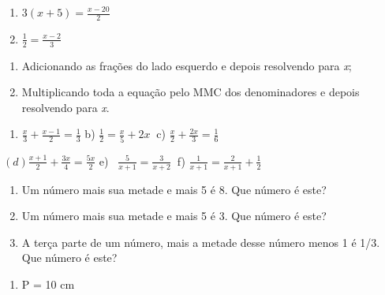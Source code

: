 \begin{exercicios}
\begin{enumerate}
	\item  \( 3 \left( x+5 \right) =\frac{x-20}{2} \)

	\item  \( \frac{1}{2}=\frac{x-2}{3} \)
\end{enumerate}


\begin{enumerate}
	\item Adicionando as frações do lado esquerdo e depois resolvendo para \textit{x};

	\item Multiplicando toda a equação pelo MMC dos denominadores e depois resolvendo para \textit{x}.
\end{enumerate}


\begin{enumerate}
	\item  \( \frac{x}{3}+\frac{x-1}{2}=\frac{1}{3} \) { b)  \( \frac{1}{2}=\frac{x}{5}+2x~  \) c)  \( \frac{x}{2}+\frac{2x}{3}=\frac{1}{6} \) }
\end{enumerate}

 \((d)  \frac{x+1}{2}+\frac{3x}{4}=\frac{5x}{2} \) { e)~  \( \frac{5}{x+1}=\frac{3}{x+2}~  \) f)  \( \frac{1}{x+1}=\frac{2}{x+1}+\frac{1}{2} \) }


\begin{enumerate}
	\item Um número mais sua metade e mais 5 é 8. Que número é este?

	\item Um número mais sua metade e mais 5 é 3. Que número é este?

	\item A terça parte de um número, mais a metade desse número menos 1 é 1/3. Que número é este?
\end{enumerate}



\begin{enumerate}
	\item P = 10 cm


\end{enumerate}
\end{exercicios}
